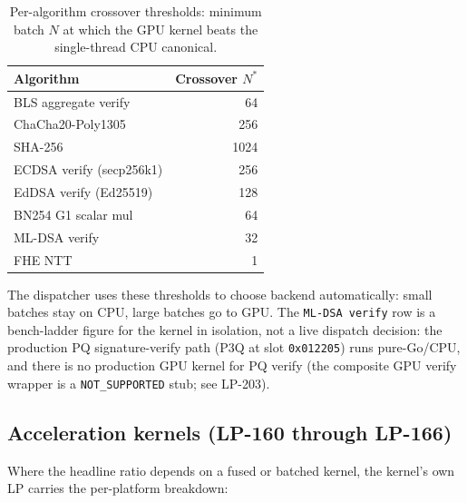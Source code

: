 \begin{table}[H]
\centering
\small
\begin{tabular}{lr}
\toprule
\textbf{Algorithm} & \textbf{Crossover $N^*$} \\
\midrule
BLS aggregate verify    & 64 \\
ChaCha20-Poly1305       & 256 \\
SHA-256                 & 1024 \\
ECDSA verify (secp256k1)& 256 \\
EdDSA verify (Ed25519)  & 128 \\
BN254 G1 scalar mul     & 64 \\
ML-DSA verify           & 32 \\
FHE NTT                 & 1 \\
\bottomrule
\end{tabular}
\caption{Per-algorithm crossover thresholds: minimum batch $N$ at which the GPU kernel beats the single-thread CPU canonical.}
\end{table}

The dispatcher uses these thresholds to choose backend automatically: small batches stay on CPU, large batches go to GPU. The \texttt{ML-DSA verify} row is a bench-ladder figure for the kernel in isolation, not a live dispatch decision: the production PQ signature-verify path (P3Q at slot \texttt{0x012205}) runs pure-Go/CPU, and there is no production GPU kernel for PQ verify (the composite GPU verify wrapper is a \texttt{NOT\_SUPPORTED} stub; see LP-203).

\subsection{Acceleration kernels (LP-160 through LP-166)}

Where the headline ratio depends on a fused or batched kernel, the kernel's own LP carries the per-platform breakdown:

